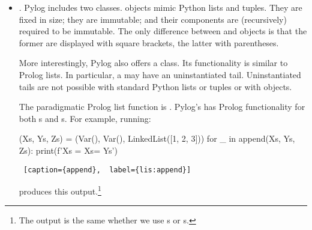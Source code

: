\begin{itemize}
\centerline{\textit{house(\textless nationality\textgreater,~\textless cigarette\textgreater,~\textless pet\textgreater,~\textless drink\textgreater,~\textless house~color\textgreater)}}
\smallv

 objects can be unified---but, as in Prolog, only if they have the same functor and the same number of tuple elements. To unify two  objects their corresponding tuple components must unify. 
\smallv

Let  and  be uninstantiated s and consider unifying the following two  objects.\footnote{The underscores represent don't-care elements.} 
\begin{python}
   house(japanese, _, P, coffee, _)
   house(N, _, zebra, coffee, _)
\end{python}

Unification would leave both  objects like this.
\begin{python}
   house(japanese, _, zebra, coffee, _)
\end{python}
Unification would have failed if, for example, the  objects had different  attributes. 

Prolog's unification functionality is central to how it solves such puzzles so easily.

\item{}. Pylog includes two  classes.  objects mimic Python lists and tuples. They are fixed in size; they are immutable; and their components are (recursively) required to be immutable. The only difference between  and  objects is that the former are displayed with square brackets, the latter with parentheses.
\smallv

More interestingly, Pylog also offers a  class. Its functionality is similar to Prolog lists. In particular, a  may have an uninstantiated tail. Uninstantiated tails are not possible with standard Python lists or tuples or with  objects.
\smallv

The paradigmatic Prolog list function is . Pylog's  has Prolog functionality for both s and s. For example, running:

\begin{minipage}{\linewidth}  \largev \hrulefill
\begin{python}
(Xs, Ys, Zs) = (Var(), Var(), LinkedList([1, 2, 3]))
for _ in append(Xs, Ys, Zs):
  print(f'Xs = {Xs}\nYs = {Ys}\n')
\end{python}
\begin{lstlisting} [caption={append},  label={lis:append}]
\end{lstlisting}
\end{minipage}
produces this output.\footnote{The output is the same whether we use s or s.}
\smallv


\end{itemize}
